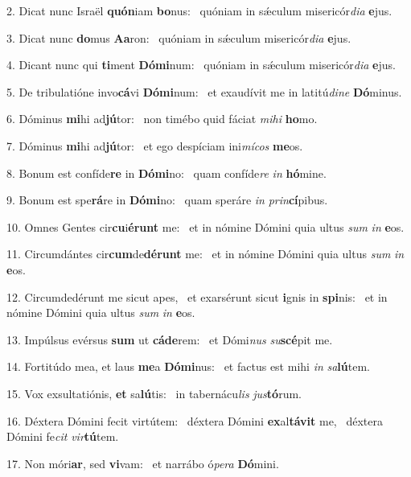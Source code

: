 2. Dicat nunc Israël \textbf{quón}iam \textbf{bo}nus: \ast\  quóniam in sǽculum misericór\textit{di}\textit{a} \textbf{e}jus.\

3. Dicat nunc \textbf{do}mus \textbf{A}\textbf{a}ron: \ast\  quóniam in sǽculum misericór\textit{di}\textit{a} \textbf{e}jus.\

4. Dicant nunc qui \textbf{ti}ment \textbf{Dó}\textbf{mi}num: \ast\  quóniam in sǽculum misericór\textit{di}\textit{a} \textbf{e}jus.\

5. De tribulatióne invo\textbf{cá}vi \textbf{Dó}\textbf{mi}num: \ast\  et exaudívit me in latitú\textit{di}\textit{ne} \textbf{Dó}minus.\

6. Dóminus \textbf{mi}hi ad\textbf{jú}tor: \ast\  non timébo quid fáciat \textit{mi}\textit{hi} \textbf{ho}mo.\

7. Dóminus \textbf{mi}hi ad\textbf{jú}tor: \ast\  et ego despíciam ini\textit{mí}\textit{cos} \textbf{me}os.\

8. Bonum est confíde\textbf{re} in \textbf{Dó}\textbf{mi}no: \ast\  quam confíde\textit{re} \textit{in} \textbf{hó}mine.\

9. Bonum est spe\textbf{rá}re in \textbf{Dó}\textbf{mi}no: \ast\  quam speráre \textit{in} \textit{prin}\textbf{cí}pibus.\

10. Omnes Gentes cir\textbf{cu}i\textbf{é}\textbf{runt} me: \ast\  et in nómine Dómini quia ultus \textit{sum} \textit{in} \textbf{e}os.\

11. Circumdántes cir\textbf{cum}de\textbf{dé}\textbf{runt} me: \ast\  et in nómine Dómini quia ultus \textit{sum} \textit{in} \textbf{e}os.\

12. Circumdedérunt me sicut apes, \dag\  et exarsérunt sicut \textbf{i}gnis in \textbf{spi}nis: \ast\  et in nómine Dómini quia ultus \textit{sum} \textit{in} \textbf{e}os.\

13. Impúlsus evérsus \textbf{sum} ut \textbf{cá}\textbf{de}rem: \ast\  et Dómi\textit{nus} \textit{su}\textbf{scé}pit me.\

14. Fortitúdo mea, et laus \textbf{me}a \textbf{Dó}\textbf{mi}nus: \ast\  et factus est mihi \textit{in} \textit{sa}\textbf{lú}tem.\

15. Vox exsultatiónis, \textbf{et} sa\textbf{lú}tis: \ast\  in tabernácu\textit{lis} \textit{jus}\textbf{tó}rum.\

16. Déxtera Dómini fecit virtútem: \dag\  déxtera Dómini \textbf{ex}al\textbf{tá}\textbf{vit} me, \ast\  déxtera Dómini fe\textit{cit} \textit{vir}\textbf{tú}tem.\

17. Non móri\textbf{ar}, sed \textbf{vi}vam: \ast\  et narrábo ó\textit{pe}\textit{ra} \textbf{Dó}mini.\

